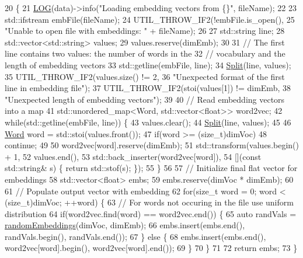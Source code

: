 \begin{DoxyCode}
20                                                                            \{
21     \hyperlink{amun_2common_2logging_8h_a8cad147aca8c526d3c8a03ae14d5c87d}{LOG}(data)->info(\textcolor{stringliteral}{"Loading embedding vectors from \{\}"}, fileName);
22 
23     std::ifstream embFile(fileName);
24     UTIL\_THROW\_IF2(!embFile.is\_open(),
25                    \textcolor{stringliteral}{"Unable to open file with embeddings: "} + fileName);
26 
27     std::string line;
28     std::vector<std::string> values;
29     values.reserve(dimEmb);
30 
31     \textcolor{comment}{// The first line contains two values: the number of words in the}
32     \textcolor{comment}{// vocabulary and the length of embedding vectors}
33     std::getline(embFile, line);
34     \hyperlink{namespaceamunmt_a10b7486d36b130609c77e8356218c0a7}{Split}(line, values);
35     UTIL\_THROW\_IF2(values.size() != 2,
36                    \textcolor{stringliteral}{"Unexpected format of the first line in embedding file"});
37     UTIL\_THROW\_IF2(stoi(values[1]) != dimEmb,
38                    \textcolor{stringliteral}{"Unexpected length of embedding vectors"});
39 
40     \textcolor{comment}{// Read embedding vectors into a map}
41     std::unordered\_map<Word, std::vector<float>> word2vec;
42     \textcolor{keywordflow}{while}(std::getline(embFile, line)) \{
43       values.clear();
44       \hyperlink{namespaceamunmt_a10b7486d36b130609c77e8356218c0a7}{Split}(line, values);
45 
46       \hyperlink{namespacemarian_a5db8bee455c97a62d6a525dc48efe4c2}{Word} word = std::stoi(values.front());
47       \textcolor{keywordflow}{if}(word >= (\textcolor{keywordtype}{size\_t})dimVoc)
48         \textcolor{keywordflow}{continue};
49 
50       word2vec[word].reserve(dimEmb);
51       std::transform(values.begin() + 1,
52                      values.end(),
53                      std::back\_inserter(word2vec[word]),
54                      [](\textcolor{keyword}{const} std::string& s) \{ \textcolor{keywordflow}{return} std::stof(s); \});
55     \}
56 
57     \textcolor{comment}{// Initialize final flat vector for embeddings}
58     std::vector<float> embs;
59     embs.reserve(dimVoc * dimEmb);
60 
61     \textcolor{comment}{// Populate output vector with embedding}
62     \textcolor{keywordflow}{for}(\textcolor{keywordtype}{size\_t} word = 0; word < (size\_t)dimVoc; ++word) \{
63       \textcolor{comment}{// For words not occuring in the file use uniform distribution}
64       \textcolor{keywordflow}{if}(word2vec.find(word) == word2vec.end()) \{
65         \textcolor{keyword}{auto} randVals = \hyperlink{classmarian_1_1Word2VecReader_a4af907a4ff8a6c48d61dd9cb770ffe1b}{randomEmbeddings}(dimVoc, dimEmb);
66         embs.insert(embs.end(), randVals.begin(), randVals.end());
67       \} \textcolor{keywordflow}{else} \{
68         embs.insert(embs.end(), word2vec[word].begin(), word2vec[word].end());
69       \}
70     \}
71 
72     \textcolor{keywordflow}{return} embs;
73   \}
\end{DoxyCode}



